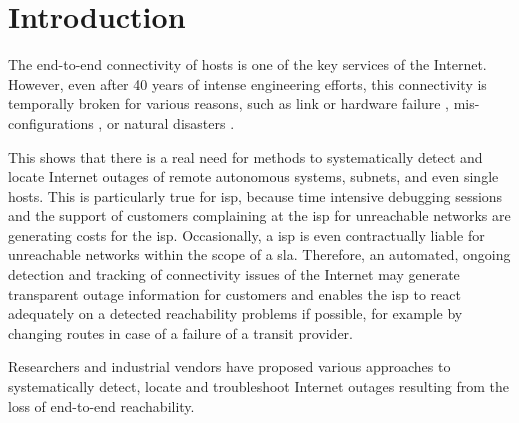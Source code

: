 \chapter{Introduction\label{Introduction}}

The end-to-end connectivity of hosts is one of the key services of the Internet. However, even after 40 years of intense engineering efforts, this connectivity is temporally broken for various reasons, such as link or hardware failure \citep{Markopoulou:2008}, mis-configurations \citep{Mahajan:2002}, or natural disasters \citep{Dainotti:2012:EBH,Schulman:2011}. 

This shows that there is a real need for methods to systematically detect and locate Internet outages of remote autonomous systems, subnets, and even single hosts. This is particularly true for \gls{isp}, because time intensive debugging sessions and the support of customers complaining at the \gls{isp} for unreachable networks are generating costs for the \gls{isp}. Occasionally, a \gls{isp} is even contractually liable for unreachable networks within the scope of a \gls{sla}. Therefore, an automated, ongoing detection and tracking of connectivity issues of the Internet may generate transparent outage information for customers and enables the \gls{isp} to react adequately on a detected reachability problems if possible, for example by changing routes in case of a failure of a transit provider. 

Researchers and industrial vendors have proposed various approaches to systematically detect, locate and troubleshoot Internet outages resulting from the loss of end-to-end reachability. 

